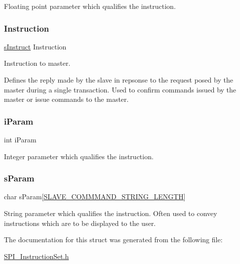 Floating point parameter which qualifies the instruction. 

\mbox{\label{structs_cmd_ae44f8e2a61a9d80037ef1379815d51cc}} 
\subsubsection{\texorpdfstring{Instruction}{Instruction}}
{\footnotesize\ttfamily \mbox{\hyperlink{_s_p_i___instruction_set_8h_a949ec019a0f52780dcdd7d5a5ba73e47}{s\+Instruct}} Instruction}



Instruction to master. 

Defines the reply made by the slave in repsonse to the request posed by the master during a single transaction. Used to confirm commands issued by the master or issue commands to the master. \mbox{\label{structs_cmd_a4d0a4aab326d0ba8eb8128adb61c0888}} 
\subsubsection{\texorpdfstring{iParam}{iParam}}
{\footnotesize\ttfamily int i\+Param}



Integer parameter which qualifies the instruction. 

\mbox{\label{structs_cmd_ae61e22459fa014bbc635b6280b5a5e1f}} 
\subsubsection{\texorpdfstring{sParam}{sParam}}
{\footnotesize\ttfamily char s\+Param\mbox{[}\mbox{\hyperlink{_s_p_i___instruction_set_8h_afb2f23f8980c03317ec47ce151335ec7}{S\+L\+A\+V\+E\+\_\+\+C\+O\+M\+M\+M\+A\+N\+D\+\_\+\+S\+T\+R\+I\+N\+G\+\_\+\+L\+E\+N\+G\+TH}}\mbox{]}}



String parameter which qualifies the instruction. Often used to convey instructions which are to be displayed to the user. 



The documentation for this struct was generated from the following file\+:\begin{DoxyCompactItemize}
\item 
\mbox{\hyperlink{_s_p_i___instruction_set_8h}{S\+P\+I\+\_\+\+Instruction\+Set.\+h}}\end{DoxyCompactItemize}
